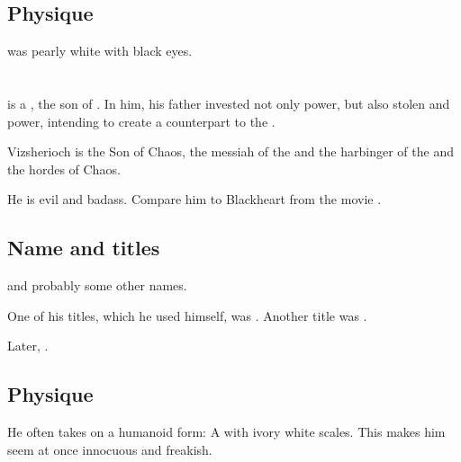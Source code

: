 \subsection{Physique}
\Nexagglachel was pearly white with black eyes. 















\section{\Vizsherioch}
\index{\Vizsherioch}
\Vizsherioch{} is a \dragon, the son of \Secherdamon. 
In him, his father invested not only \draconic{} power, but also stolen \bane{} and \resphan{} power, intending to create a \draconic{} counterpart to the \satharioth. 

Vizsherioch is the Son of Chaos, the messiah of the \dragons and the harbinger of the \xs and the hordes of Chaos. 

He is evil and badass. 
Compare him to Blackheart from the movie \cite{Movie:GhostRider}.









\subsection{Name and titles}
\Vizsherioch and probably some other names. 

One of his titles, which he used himself, was . 
Another title was .

Later,  . 









\subsection{Physique}
He often takes on a humanoid form: 
A \scatha{} with ivory white scales. 
This makes him seem at once innocuous and freakish. 

